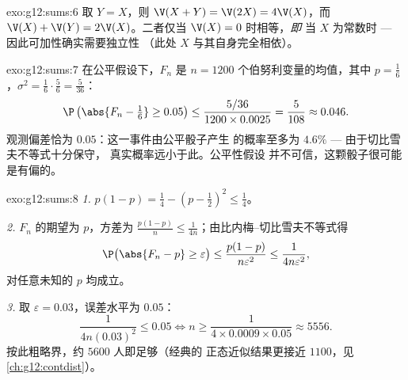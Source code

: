 \begin{solution}{exo:g12:sums:6}
取 $Y = X$，则 $\V(X + Y) = \V(2X) = 4\V(X)$，而
$\V(X) + \V(Y) = 2\V(X)$。二者仅当 $\V(X) = 0$ 时相等，\emph{即}
当 $X$ 为常数时 --- 因此可加性确实需要独立性
（此处 $X$ 与其自身完全相依）。
\end{solution}

\begin{solution}{exo:g12:sums:7}
在公平假设下，$F_n$ 是 $n = 1200$ 个伯努利变量的均值，其中
$p = \frac16$，$\sigma^2 = \frac16\cdot\frac56 = \frac{5}{36}$：
\[
\P\left(\abs{F_n - \tfrac16} \geq 0.05\right)
\leq \frac{5/36}{1200 \times 0.0025} = \frac{5}{108} \approx 0.046 .
\]
观测偏差恰为 $0.05$：这一事件由公平骰子产生
的概率至多为 $4.6\%$ --- 由于切比雪夫不等式十分保守，
真实概率远小于此。公平性假设
并不可信，这颗骰子很可能是有偏的。
\end{solution}

\begin{solution}{exo:g12:sums:8}
\emph{1.} $p(1-p) = \frac14 - \left(p - \frac12\right)^2 \leq \frac14$。

\emph{2.} $F_n$ 的期望为 $p$，方差为
$\frac{p(1-p)}{n} \leq \frac{1}{4n}$；由比内梅--切比雪夫不等式得
\[
\P\bigl(\abs{F_n - p} \geq \varepsilon\bigr)
\leq \frac{p(1-p)}{n\varepsilon^2} \leq \frac{1}{4n\varepsilon^2},
\]
对任意未知的 $p$ 均成立。

\emph{3.} 取 $\varepsilon = 0.03$，误差水平为 $0.05$：
\[
\frac{1}{4n(0.03)^2} \leq 0.05
\iff n \geq \frac{1}{4 \times 0.0009 \times 0.05} \approx 5556 .
\]
按此粗略界，约 $5600$ 人即足够（经典的
正态近似结果更接近 $1100$，见
\cref{ch:g12:contdist}）。
\end{solution}


